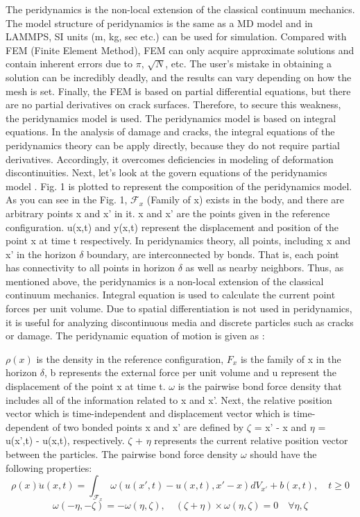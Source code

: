 The peridynamics is the non-local extension of the classical continuum mechanics. The model structure of peridynamics is the same as a MD model and in LAMMPS, SI units (m, kg, sec etc.) can be used for simulation. Compared with FEM (Finite Element Method), FEM can only acquire approximate solutions and contain inherent errors due to $\pi$, $\sqrt{N}$, etc. The user's mistake in obtaining a solution can be incredibly deadly, and the results can vary depending on how the mesh is set. Finally, the FEM is based on partial differential equations, but there are no partial derivatives on crack surfaces. Therefore, to secure this weakness, the peridynamics model is used. The peridynamics model is based on integral equations. In the analysis of damage and cracks, the integral equations of the peridynamics theory can be apply directly, because they do not require partial derivatives. Accordingly, it overcomes deficiencies in modeling of deformation discontinuities. Next, let's look at the govern equations of the peridynamics model \cite{Ref2,Ref3,Ref4}. Fig. 1 is plotted to represent the composition of the peridynamics model. As you can see in the Fig. 1, $\mathcal{F}_x$ (Family of x) exists in the body, and there are arbitrary points x and x' in it. x and x' are the points given in the reference configuration. u(x,t) and y(x,t) represent the displacement and position of the point x at time t respectively. In peridynamics theory, all points, including x and x' in the horizon $\delta$ boundary, are interconnected by bonds. That is, each point has connectivity to all points in horizon $\delta$ as well as nearby neighbors. Thus, as mentioned above, the peridynamics is a non-local extension of the classical continuum mechanics. Integral equation is used to calculate the current point forces per unit volume. Due to spatial differentiation is not used in peridynamics, it is useful for analyzing discontinuous media and discrete particles such as cracks or damage. The peridynamic equation of motion is given as :


 $\rho(x)$ is the density in the reference configuration, $F_x$ is the family of x in the horizon $\delta$, b represents the external force per unit volume and u represent the displacement of the point x at time t. $\omega$ is the pairwise bond force density that includes all of the information related to x and x'. Next, the relative position vector which is time-independent and displacement vector which is time-dependent of two bonded points x and x' are defined by $\zeta$ = x' - x and $\eta$ = u(x',t) - u(x,t), respectively. $\zeta$ + $\eta$ represents the current relative position vector between the particles. The pairwise bond force density $\omega$ should have the following properties: 
\begin{equation}
\rho(x)\ddot{u}(x,t)=\int_{\mathcal{F}_x} \omega(u(x',t)-u(x,t),x'-x)dV_{x'}+b(x,t), \quad t\geq0
\end{equation}
\begin{equation}
\omega(-\eta,-\zeta)= -\omega(\eta, \zeta),\quad(\zeta + \eta)\times\omega(\eta, \zeta)=0 \quad\forall\eta,\zeta
\end{equation}




